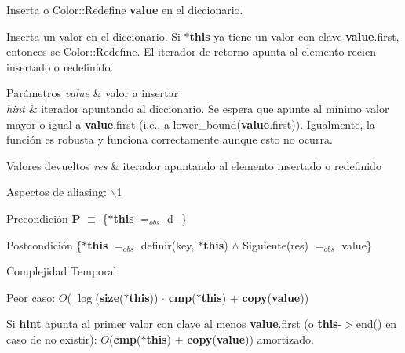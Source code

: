 \-Inserta o \-Color\-::\-Redefine {\bfseries value} en el diccionario. 

\-Inserta un valor en el diccionario. \-Si {\bfseries $\ast$this} ya tiene un valor con clave {\bfseries value}.first, entonces se \-Color\-::\-Redefine. \-El iterador de retorno apunta al elemento recien insertado o redefinido.


\begin{DoxyParams}{\-Parámetros}
{\em value} & valor a insertar \\
\hline
{\em hint} & iterador apuntando al diccionario. \-Se espera que apunte al mínimo valor mayor o igual a {\bfseries value}.first (i.\-e., a lower\-\_\-bound({\bfseries value}.first)). \-Igualmente, la función es robusta y funciona correctamente aunque esto no ocurra. \\
\hline
\end{DoxyParams}

\begin{DoxyRetVals}{\-Valores devueltos}
{\em res} & iterador apuntando al elemento insertado o redefinido\\
\hline
\end{DoxyRetVals}
\begin{DoxyParagraph}{\-Aspectos de aliasing\-:}
$\backslash$1
\end{DoxyParagraph}
\begin{DoxyPrecond}{\-Precondición}
{\bfseries \-P} $\equiv$ \{{\bfseries $\ast$this} $=_{obs}$ d\-\_\} 
\end{DoxyPrecond}
\begin{DoxyPostcond}{\-Postcondición}
\{{\bfseries $\ast$this} $=_{obs}$ definir(key, {\bfseries $\ast$this}) $\land$ \-Siguiente(res) $=_{obs}$ value\}
\end{DoxyPostcond}

\begin{DoxyDescription}
\item[\-Complejidad \-Temporal]
\begin{DoxyItemize}
\item \-Peor caso\-: $O$( $\log$({\bfseries size}({\bfseries $\ast$this})) $\cdot$ {\bfseries cmp}({\bfseries $\ast$this}) $+$ {\bfseries copy}({\bfseries value}))
\item \-Si {\bfseries hint} apunta al primer valor con clave al menos {\bfseries value}.first (o {\bfseries this}-\/$>$\hyperlink{classaed2_1_1map_a76023e6a56cb625513e1b5ea028bf983_a76023e6a56cb625513e1b5ea028bf983}{end()} en caso de no existir)\-: $O$({\bfseries cmp}({\bfseries $\ast$this}) $+$ {\bfseries copy}({\bfseries value})) amortizado. 
\end{DoxyItemize}
\end{DoxyDescription}


